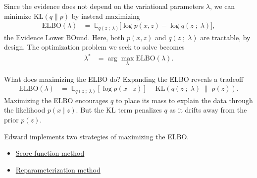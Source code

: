 Since the evidence does not depend on the variational parameters $\lambda$,
we can minimize $\text{KL}(q\|p)$ by instead maximizing
\begin{align*}
  \text{ELBO}(\lambda)
  &=\;
  \mathbb{E}_{q(z\;;\;\lambda)}
  \big[
  \log p(x, z)
  -
  \log q(z\;;\;\lambda)
  \big],
\end{align*}
the Evidence Lower BOund. Here, both $p(x,z)$ and $q(z\;;\;\lambda)$ are
tractable, by design. The optimization problem we seek to solve becomes
\begin{align*}
  \lambda^*
  &=
  \arg \max_\lambda \text{ELBO}(\lambda).
\end{align*}

What does maximizing the ELBO do? Expanding the ELBO reveals a tradeoff
\begin{align*}
  \text{ELBO}(\lambda) 
  &=\;
  \mathbb{E}_{q(z \;;\; \lambda)}[\log p(x \mid z)]  
  - \text{KL}(q(z \;;\; \lambda) \;\|\; p(z)).
\end{align*}
Maximizing the ELBO encourages $q$ to place its mass to explain the data through
the likelihood $p(x \mid z)$. But the KL term penalizes $q$ as it drifts away
from the prior $p(z)$. 

Edward implements two strategies of maximizing the ELBO.
\begin{itemize}
    \item \href{tut_KLqp_score.html}{Score function method}
    \item \href{tut_KLqp_reparam.html}{Reparameterization method}
  \end{itemize}
